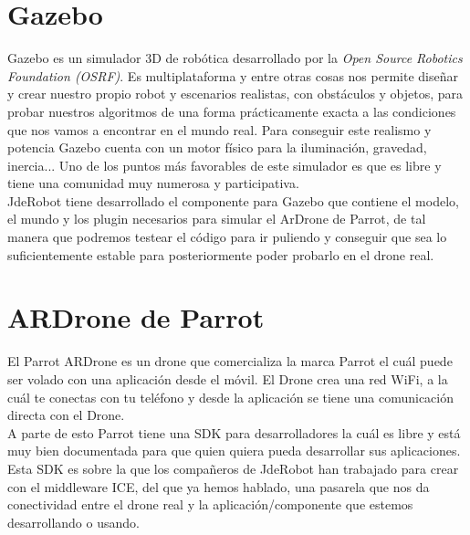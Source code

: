 \section{Gazebo}

Gazebo es un simulador 3D de robótica desarrollado por la \textit{Open Source Robotics Foundation (OSRF)}. Es multiplataforma y entre otras cosas nos permite diseñar y crear nuestro propio robot y escenarios realistas, con obstáculos y objetos, para probar nuestros algoritmos de una forma prácticamente exacta a las condiciones que nos vamos a encontrar en el mundo real. Para conseguir este realismo y potencia Gazebo cuenta con un motor físico para la iluminación, gravedad, inercia... Uno de los puntos más favorables de este simulador es que es libre y tiene una comunidad muy numerosa y participativa.\\

JdeRobot tiene desarrollado el componente para Gazebo que contiene el modelo, el mundo y los plugin necesarios para simular el ArDrone de Parrot, de tal manera que podremos testear el código para ir puliendo y conseguir que sea lo suficientemente estable para posteriormente poder probarlo en el drone real.


\section{ARDrone de Parrot}

El Parrot ARDrone es un drone que comercializa la marca Parrot el cuál puede ser volado con una aplicación desde el móvil. El Drone crea una red WiFi, a la cuál te conectas con tu teléfono y desde la aplicación se tiene una comunicación directa con el Drone.\\

A parte de esto Parrot tiene una SDK para desarrolladores la cuál es libre y está muy bien documentada para que quien quiera pueda desarrollar sus aplicaciones. Esta SDK es sobre la que los compañeros de JdeRobot han trabajado para crear con el middleware ICE, del que ya hemos hablado, una pasarela que nos da conectividad entre el drone real y la aplicación/componente que estemos desarrollando o usando.








